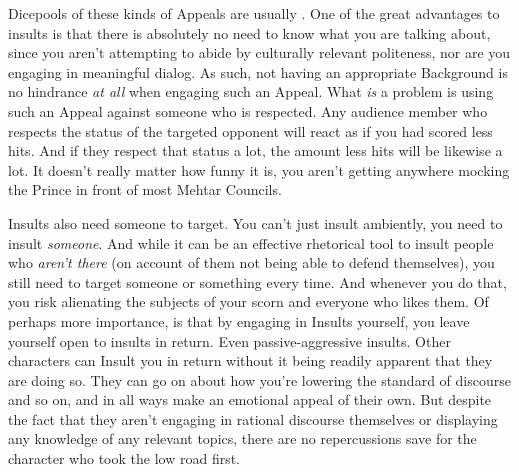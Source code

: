 Dicepools of these kinds of Appeals are usually . One of the great advantages to insults is that there is absolutely no need to know what you are talking about, since you aren't attempting to abide by culturally relevant politeness, nor are you engaging in meaningful dialog. As such, not having an appropriate Background is no hindrance \textit{at all} when engaging such an Appeal. What \textit{is} a problem is using such an Appeal against someone who is respected. Any audience member who respects the status of the targeted opponent will react as if you had scored less hits. And if they respect that status a lot, the amount less hits will be likewise a lot. It doesn't really matter how funny it is, you aren't getting anywhere mocking the Prince in front of most Mehtar Councils.

Insults also need someone to target. You can't just insult ambiently, you need to insult \textit{someone}. And while it can be an effective rhetorical tool to insult people who \textit{aren't there} (on account of them not being able to defend themselves), you still need to target someone or something every time. And whenever you do that, you risk alienating the subjects of your scorn and everyone who likes them. Of perhaps more importance, is that by engaging in Insults yourself, you leave yourself open to insults in return. Even passive-aggressive insults. Other characters can Insult you in return without it being readily apparent that they are doing so. They can go on about how you're lowering the standard of discourse and so on, and in all ways make an emotional appeal of their own. But despite the fact that they aren't engaging in rational discourse themselves or displaying any knowledge of any relevant topics, there are no repercussions save for the character who took the low road first.
